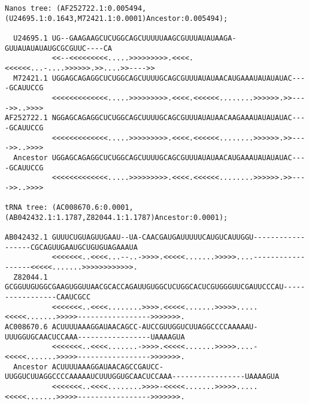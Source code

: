 \documentclass[landscape]{article}
\begin{document}
\centering
\begin{verbatim}
Nanos tree: (AF252722.1:0.005494,(U24695.1:0.1643,M72421.1:0.0001)Ancestor:0.005494);

  U24695.1 UG--GAAGAAGCUCUGGCAGCUUUUUAAGCGUUUAUAUAAGA-GUUAUAUAUAUGCGCGUUC----CA
           <<--<<<<<<<<<.....>>>>>>>>>.<<<<.<<<<<<...-....>>>>>>.>>....>>---->>
  M72421.1 UGGAGCAGAGGCUCUGGCAGCUUUUGCAGCGUUUAUAUAACAUGAAAUAUAUAUAC----GCAUUCCG
           <<<<<<<<<<<<<.....>>>>>>>>>.<<<<.<<<<<<........>>>>>>.>>---->>..>>>>
AF252722.1 NGGAGCAGAGGCUCUGGCAGCUUUUGCAGCGUUUAUAUAACAAGAAAUAUAUAUAC----GCAUUCCG
           <<<<<<<<<<<<<.....>>>>>>>>>.<<<<.<<<<<<........>>>>>>.>>---->>..>>>>
  Ancestor UGGAGCAGAGGCUCUGGCAGCUUUUGCAGCGUUUAUAUAACAUGAAAUAUAUAUAC----GCAUUCCG
           <<<<<<<<<<<<<.....>>>>>>>>>.<<<<.<<<<<<........>>>>>>.>>---->>..>>>>

tRNA tree: (AC008670.6:0.0001,(AB042432.1:1.1787,Z82044.1:1.1787)Ancestor:0.0001);

AB042432.1 GUUUCUGUAGUUGAAU--UA-CAACGAUGAUUUUUCAUGUCAUUGGU------------------CGCAGUUGAAUGCUGUGUAGAAAUA
           <<<<<<<..<<<<...--..->>>>.<<<<<.......>>>>>....------------------<<<<<.......>>>>>>>>>>>>.
  Z82044.1 GCGGUUGUGGCGAAGUGGUUAACGCACCAGAUUGUGGCUCUGGCACUCGUGGGUUCGAUUCCCAU-----------------CAAUCGCC
           <<<<<<<..<<<<........>>>>.<<<<<.......>>>>>.....<<<<<.......>>>>>----------------->>>>>>>.
AC008670.6 ACUUUUAAAGGAUAACAGCC-AUCCGUUGGUCUUAGGCCCCAAAAAU-UUUGGUGCAACUCCAAA-----------------UAAAAGUA
           <<<<<<<..<<<<.......->>>>.<<<<<.......>>>>>....-<<<<<.......>>>>>----------------->>>>>>>.
  Ancestor ACUUUUAAAGGAUAACAGCCGAUCC-UUGGUCUUAGGCCCCAAAAAUCUUUGGUGCAACUCCAAA-----------------UAAAAGUA
           <<<<<<<..<<<<........>>>>-<<<<<.......>>>>>.....<<<<<.......>>>>>----------------->>>>>>>.
\end{verbatim}
\end{document}
